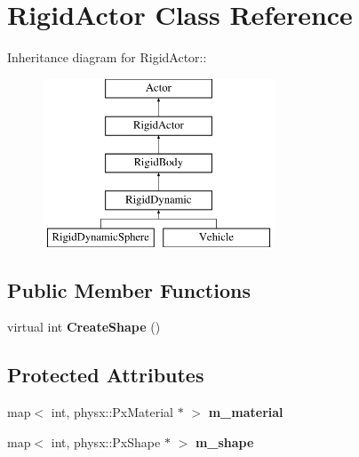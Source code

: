 \hypertarget{classRigidActor}{
\section{RigidActor Class Reference}
\label{classRigidActor}
}
Inheritance diagram for RigidActor::\begin{figure}[H]
\begin{center}
\leavevmode
\includegraphics[height=5cm]{classRigidActor}
\end{center}
\end{figure}
\subsection*{Public Member Functions}
\begin{DoxyCompactItemize}
\item 
\hypertarget{classRigidActor_a959e77fa65f0d97b979a1e69d24f0200}{
virtual int {\bfseries CreateShape} ()}
\label{classRigidActor_a959e77fa65f0d97b979a1e69d24f0200}

\end{DoxyCompactItemize}
\subsection*{Protected Attributes}
\begin{DoxyCompactItemize}
\item 
\hypertarget{classRigidActor_aef1e9cdd2498a459d3a655c4a57ed499}{
map$<$ int, physx::PxMaterial $\ast$ $>$ {\bfseries m\_\-material}}
\label{classRigidActor_aef1e9cdd2498a459d3a655c4a57ed499}

\item 
\hypertarget{classRigidActor_aba47682bd59af202da0f950cf19acb5f}{
map$<$ int, physx::PxShape $\ast$ $>$ {\bfseries m\_\-shape}}
\label{classRigidActor_aba47682bd59af202da0f950cf19acb5f}

\end{DoxyCompactItemize}
